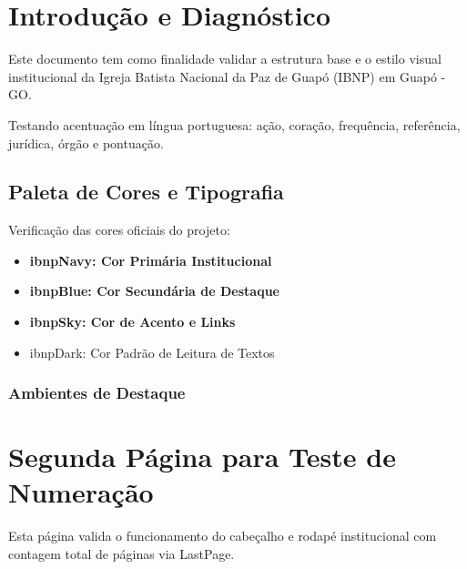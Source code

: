 \documentclass[12pt,a4paper]{article}
\begin{document}
\section{Introdução e Diagnóstico}
Este documento tem como finalidade validar a estrutura base e o estilo visual institucional da Igreja Batista Nacional da Paz de Guapó (IBNP) em Guapó - GO.

Testando acentuação em língua portuguesa: ação, coração, frequência, referência, jurídica, órgão e pontuação.

\subsection{Paleta de Cores e Tipografia}
Verificação das cores oficiais do projeto:
\begin{itemize}
    \item \textcolor{ibnpNavy}{\textbf{ibnpNavy: Cor Primária Institucional}}
    \item \textcolor{ibnpBlue}{\textbf{ibnpBlue: Cor Secundária de Destaque}}
    \item \textcolor{ibnpSky}{\textbf{ibnpSky: Cor de Acento e Links}}
    \item \textcolor{ibnpDark}{ibnpDark: Cor Padrão de Leitura de Textos}
\end{itemize}

\subsubsection{Ambientes de Destaque}

\newpage

\section{Segunda Página para Teste de Numeração}
Esta página valida o funcionamento do cabeçalho e rodapé institucional com contagem total de páginas via LastPage.
\end{document}
